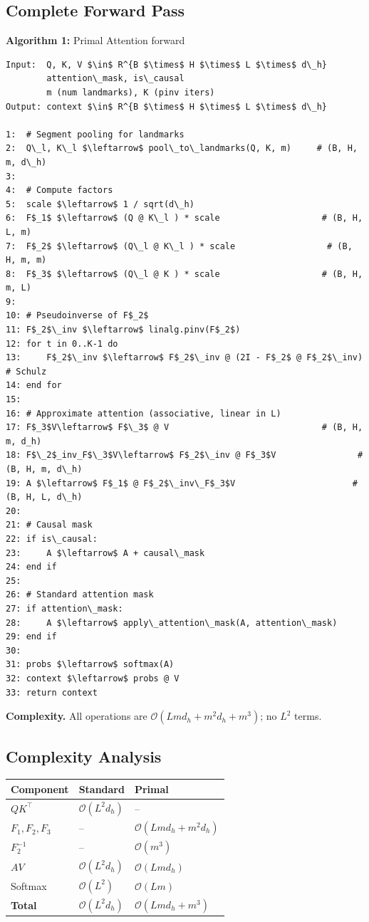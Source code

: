 \subsection{Complete Forward Pass}

\textbf{Algorithm 1:} Primal Attention forward
\begin{lstlisting}
Input:  Q, K, V $\in$ R^{B $\times$ H $\times$ L $\times$ d\_h}
        attention\_mask, is\_causal
        m (num landmarks), K (pinv iters)
Output: context $\in$ R^{B $\times$ H $\times$ L $\times$ d\_h}

1:  # Segment pooling for landmarks
2:  Q\_l, K\_l $\leftarrow$ pool\_to\_landmarks(Q, K, m)     # (B, H, m, d\_h)
3:
4:  # Compute factors
5:  scale $\leftarrow$ 1 / sqrt(d\_h)
6:  F$_1$ $\leftarrow$ (Q @ K\_l ) * scale                    # (B, H, L, m)
7:  F$_2$ $\leftarrow$ (Q\_l @ K\_l ) * scale                  # (B, H, m, m)
8:  F$_3$ $\leftarrow$ (Q\_l @ K ) * scale                    # (B, H, m, L)
9:
10: # Pseudoinverse of F$_2$
11: F$_2$\_inv $\leftarrow$ linalg.pinv(F$_2$)
12: for t in 0..K-1 do
13:     F$_2$\_inv $\leftarrow$ F$_2$\_inv @ (2I - F$_2$ @ F$_2$\_inv)   # Schulz
14: end for
15:
16: # Approximate attention (associative, linear in L)
17: F$_3$V\leftarrow$ F$\_3$ @ V                              # (B, H, m, d_h)
18: F$\_2$_inv_F$\_3$V\leftarrow$ F$_2$\_inv @ F$_3$V                # (B, H, m, d\_h)
19: A $\leftarrow$ F$_1$ @ F$_2$\_inv\_F$_3$V                       # (B, H, L, d\_h)
20:
21: # Causal mask
22: if is\_causal:
23:     A $\leftarrow$ A + causal\_mask
24: end if
25:
26: # Standard attention mask
27: if attention\_mask:
28:     A $\leftarrow$ apply\_attention\_mask(A, attention\_mask)
29: end if
30:
31: probs $\leftarrow$ softmax(A)
32: context $\leftarrow$ probs @ V
33: return context
\end{lstlisting}

\textbf{Complexity.} All operations are $\mathcal{O}(L m d_h + m^2 d_h + m^3)$; no 
$L^2$ terms.

\subsection{Complexity Analysis}

\begin{table}[H]
\centering
\small
\begin{tabular}{lll}
\toprule
\textbf{Component} & \textbf{Standard} & \textbf{Primal} \\
\midrule
$Q K^\top$ & $\mathcal{O}(L^2 d_h)$ & -- \\
$F_1, F_2, F_3$ & -- & $\mathcal{O}(L m d_h + m^2 d_h)$ \\
$F_2^{-1}$ & -- & $\mathcal{O}(m^3)$ \\
$A V$ & $\mathcal{O}(L^2 d_h)$ & $\mathcal{O}(L m d_h)$ \\
Softmax & $\mathcal{O}(L^2)$ & $\mathcal{O}(L m)$ \\
\textbf{Total} & $\mathcal{O}(L^2 d_h)$ & $\mathcal{O}(L m d_h + m^3)$ \\
\bottomrule
\end{tabular}
\end{table}

